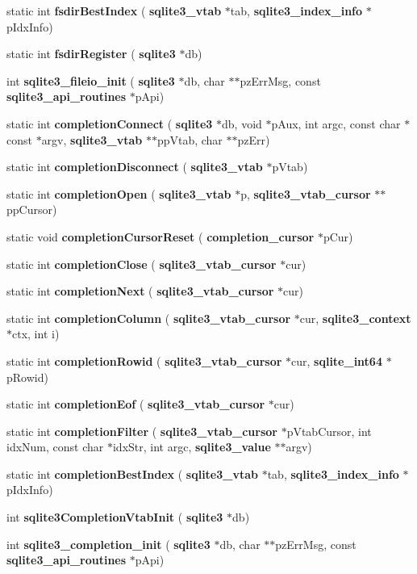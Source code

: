 \begin{DoxyCompactItemize}
static int \textbf{ fsdir\+Best\+Index} (\textbf{ sqlite3\+\_\+vtab} $\ast$tab, \textbf{ sqlite3\+\_\+index\+\_\+info} $\ast$p\+Idx\+Info)
\item 
static int \textbf{ fsdir\+Register} (\textbf{ sqlite3} $\ast$db)
\item 
int \textbf{ sqlite3\+\_\+fileio\+\_\+init} (\textbf{ sqlite3} $\ast$db, char $\ast$$\ast$pz\+Err\+Msg, const \textbf{ sqlite3\+\_\+api\+\_\+routines} $\ast$p\+Api)
\item 
static int \textbf{ completion\+Connect} (\textbf{ sqlite3} $\ast$db, void $\ast$p\+Aux, int argc, const char $\ast$const $\ast$argv, \textbf{ sqlite3\+\_\+vtab} $\ast$$\ast$pp\+Vtab, char $\ast$$\ast$pz\+Err)
\item 
static int \textbf{ completion\+Disconnect} (\textbf{ sqlite3\+\_\+vtab} $\ast$p\+Vtab)
\item 
static int \textbf{ completion\+Open} (\textbf{ sqlite3\+\_\+vtab} $\ast$p, \textbf{ sqlite3\+\_\+vtab\+\_\+cursor} $\ast$$\ast$pp\+Cursor)
\item 
static void \textbf{ completion\+Cursor\+Reset} (\textbf{ completion\+\_\+cursor} $\ast$p\+Cur)
\item 
static int \textbf{ completion\+Close} (\textbf{ sqlite3\+\_\+vtab\+\_\+cursor} $\ast$cur)
\item 
static int \textbf{ completion\+Next} (\textbf{ sqlite3\+\_\+vtab\+\_\+cursor} $\ast$cur)
\item 
static int \textbf{ completion\+Column} (\textbf{ sqlite3\+\_\+vtab\+\_\+cursor} $\ast$cur, \textbf{ sqlite3\+\_\+context} $\ast$ctx, int i)
\item 
static int \textbf{ completion\+Rowid} (\textbf{ sqlite3\+\_\+vtab\+\_\+cursor} $\ast$cur, \textbf{ sqlite\+\_\+int64} $\ast$p\+Rowid)
\item 
static int \textbf{ completion\+Eof} (\textbf{ sqlite3\+\_\+vtab\+\_\+cursor} $\ast$cur)
\item 
static int \textbf{ completion\+Filter} (\textbf{ sqlite3\+\_\+vtab\+\_\+cursor} $\ast$p\+Vtab\+Cursor, int idx\+Num, const char $\ast$idx\+Str, int argc, \textbf{ sqlite3\+\_\+value} $\ast$$\ast$argv)
\item 
static int \textbf{ completion\+Best\+Index} (\textbf{ sqlite3\+\_\+vtab} $\ast$tab, \textbf{ sqlite3\+\_\+index\+\_\+info} $\ast$p\+Idx\+Info)
\item 
int \textbf{ sqlite3\+Completion\+Vtab\+Init} (\textbf{ sqlite3} $\ast$db)
\item 
int \textbf{ sqlite3\+\_\+completion\+\_\+init} (\textbf{ sqlite3} $\ast$db, char $\ast$$\ast$pz\+Err\+Msg, const \textbf{ sqlite3\+\_\+api\+\_\+routines} $\ast$p\+Api)

\end{DoxyCompactItemize}
